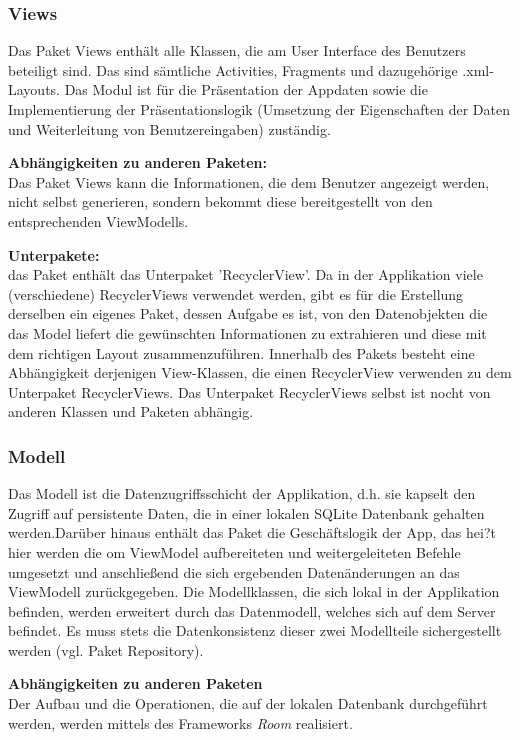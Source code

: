 \documentclass[parskip=full]{scrartcl}
\begin{document}
\subsubsection{Views}
Das Paket Views enthält alle Klassen, die am User Interface des Benutzers beteiligt sind. Das sind sämtliche Activities, Fragments und dazugehörige .xml-Layouts. Das Modul ist für die Präsentation der Appdaten sowie die Implementierung der Präsentationslogik (Umsetzung der Eigenschaften der Daten und Weiterleitung von Benutzereingaben) zuständig.

\textbf{Abhängigkeiten zu anderen Paketen:}\\
Das Paket Views kann die Informationen, die dem Benutzer angezeigt werden, nicht selbst generieren, sondern bekommt diese bereitgestellt von den entsprechenden ViewModells.

\textbf{Unterpakete:}\\
das Paket enthält das Unterpaket 'RecyclerView'. Da in der Applikation viele (verschiedene) RecyclerViews verwendet werden, gibt es für die Erstellung derselben ein eigenes Paket, dessen Aufgabe es ist, von den Datenobjekten die das Model liefert die gewünschten Informationen zu extrahieren und diese mit dem richtigen Layout zusammenzuführen. Innerhalb des Pakets besteht eine Abhängigkeit derjenigen View-Klassen, die einen RecyclerView verwenden zu dem Unterpaket RecyclerViews. Das Unterpaket RecyclerViews selbst ist nocht von anderen Klassen und Paketen abhängig.

\subsubsection{Modell}
Das Modell ist die Datenzugriffsschicht der Applikation, d.h. sie kapselt den Zugriff auf persistente Daten, die in einer lokalen SQLite Datenbank gehalten werden.Darüber hinaus enthält das Paket die Geschäftslogik der App, das hei?t hier werden die om ViewModel aufbereiteten und weitergeleiteten Befehle umgesetzt und anschließend die sich ergebenden Datenänderungen an das ViewModell zurückgegeben. Die Modellklassen, die sich lokal in der Applikation befinden, werden erweitert durch das Datenmodell, welches sich auf dem Server befindet. Es muss stets die Datenkonsistenz dieser zwei Modellteile sichergestellt werden (vgl. Paket Repository).

\textbf{Abhängigkeiten zu anderen Paketen}\\
Der Aufbau und die Operationen, die auf der lokalen Datenbank durchgeführt werden, werden mittels des Frameworks \textit{Room} realisiert.
\end{document}
